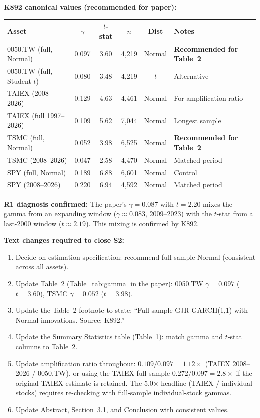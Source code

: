 \documentclass[12pt,a4paper]{article}
\begin{document}
\medskip
\noindent\textbf{K892 canonical values (recommended for paper):}

\begin{center}
\small
\begin{tabular}{lccccl}
\toprule
Asset & $\gamma$ & $t$-stat & $n$ & Dist & Notes \\
\midrule
0050.TW (full, Normal) & 0.097 & 3.60 & 4,219 & Normal & \textbf{Recommended for Table~2} \\
0050.TW (full, Student-$t$) & 0.080 & 3.48 & 4,219 & $t$ & Alternative \\
TAIEX (2008--2026) & 0.129 & 4.63 & 4,461 & Normal & For amplification ratio \\
TAIEX (full 1997--2026) & 0.109 & 5.62 & 7,044 & Normal & Longest sample \\
TSMC (full, Normal) & 0.052 & 3.98 & 6,525 & Normal & \textbf{Recommended for Table~2} \\
TSMC (2008--2026) & 0.047 & 2.58 & 4,470 & Normal & Matched period \\
SPY (full, Normal) & 0.189 & 6.88 & 6,601 & Normal & Control \\
SPY (2008--2026) & 0.220 & 6.94 & 4,592 & Normal & Matched period \\
\bottomrule
\end{tabular}
\end{center}

\noindent\textbf{R1 diagnosis confirmed:} The paper's $\gamma = 0.087$ with $t = 2.20$ mixes the gamma from an expanding window ($\gamma \approx 0.083$, 2009--2023) with the $t$-stat from a last-2000 window ($t \approx 2.19$). This mixing is confirmed by K892.

\noindent\textbf{Text changes required to close S2:}
\begin{enumerate}[nosep]
\item Decide on estimation specification: recommend full-sample Normal (consistent across all assets).
\item Update Table~2 (Table~\ref{tab:gamma} in the paper): 0050.TW $\gamma = 0.097$ ($t = 3.60$), TSMC $\gamma = 0.052$ ($t = 3.98$).
\item Update the Table~2 footnote to state: ``Full-sample GJR-GARCH(1,1) with Normal innovations. Source: K892.''
\item Update the Summary Statistics table (Table~1): match gamma and $t$-stat columns to Table~2.
\item Update amplification ratio throughout: $0.109 / 0.097 = 1.12\times$ (TAIEX 2008--2026 / 0050.TW), or using the TAIEX full-sample $0.272 / 0.097 = 2.8\times$ if the original TAIEX estimate is retained. The 5.0$\times$ headline (TAIEX / individual stocks) requires re-checking with full-sample individual-stock gammas.
\item Update Abstract, Section~3.1, and Conclusion with consistent values.
\end{enumerate}
\end{document}
